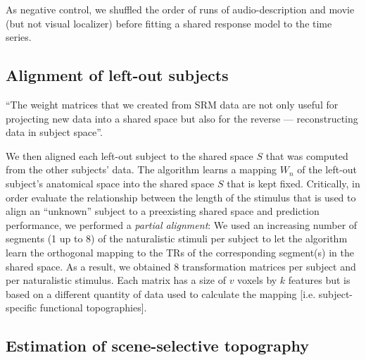 
As negative control, we shuffled the order of runs of audio-description and
movie (but not visual localizer) before fitting a shared response model to the
time series.


\subsection{Alignment of left-out subjects}


%
%

``The weight matrices that we created from SRM data are not only useful for
projecting new data into a shared space but also for the reverse —
reconstructing data in subject space''.

%
We then aligned each left-out subject to the shared space $S$ that was computed
from the other subjects' data.
%
The algorithm learns a mapping $W_{n}$ of the left-out subject's anatomical
space into the shared space $S$ that is kept fixed.
%
Critically, in order evaluate the relationship between the length of the
stimulus that is used to align an ``unknown'' subject to a preexisting shared
space and prediction performance, we performed a \textit{partial alignment}:
%
We used an increasing number of segments (1 up to 8) of the naturalistic stimuli
per subject to let the algorithm learn the orthogonal mapping to the TRs of the
corresponding segment(s) in the shared space.
%
As a result, we obtained 8 transformation matrices per subject and per
naturalistic stimulus.
%
Each matrix has a size of $v$ voxels by $k$ features but is based on a different
quantity of data used to calculate the mapping [i.e. subject-specific functional
topographies].


\subsection{Estimation of scene-selective topography}

